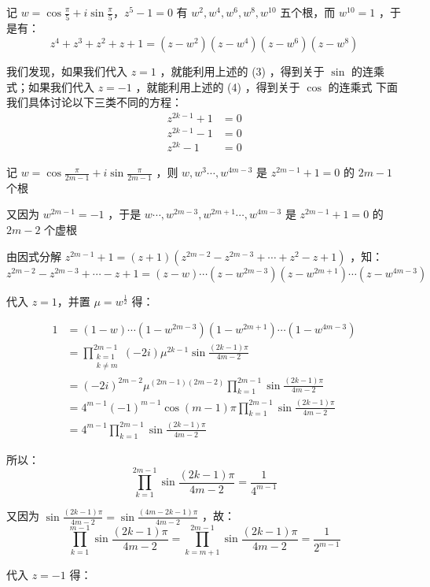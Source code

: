 记 $\displaystyle{w=\cos\frac{\pi}5+i\sin\frac{\pi}5}$，$z^5-1=0$ 有 $w^2,w^4,w^6,w^8,w^{10}$ 五个根，而 $w^{10}=1$ ，于是有：
$$z^4+z^3+z^2+z+1=(z-w^2)(z-w^4)(z-w^6)(z-w^8)$$

我们发现，如果我们代入 $z=1$ ，就能利用上述的 (3) ，得到关于 $\sin$ 的连乘式；如果我们代入 $z=-1$ ，就能利用上述的 (4) ，得到关于 $\cos$ 的连乘式
下面我们具体讨论以下三类不同的方程：
$$\begin{aligned}
z^{2k-1}+1&=0\\z^{2k-1}-1&=0 \\z^{2k}-1&=0
\end{aligned}$$

记 $\displaystyle{w=\cos\frac{\pi}{2m-1}+i\sin\frac{\pi}{2m-1}}$ ，则 $w,w^3\cdots,w^{4m-3}$ 是 $z^{2m-1}+1=0$ 的 $2m-1$ 个根

又因为 $w^{2m-1}=-1$ ，于是 $w\cdots ,w^{2m-3},w^{2m+1}\cdots ,w^{4m-3}$ 是 $z^{2m-1}+1=0$ 的 $2m-2$ 个虚根

由因式分解 $z^{2m-1}+1=(z+1)(z^{2m-2}-z^{2m-3}+\cdots+z^{2}-z+1)$ ，知：
$$z^{2m-2}-z^{2m-3}+\cdots-z+1=(z-w)\cdots(z-w^{2m-3})(z-w^{2m+1})\cdots(z-w^{4m-3})$$

代入 $z=1$，并置 $\mu=w^{\frac12}$ 得：

$$\begin{aligned}
1&=(1-w)\cdots(1-w^{2m-3})(1-w^{2m+1})\cdots(1-w^{4m-3})\\&=\prod_{\substack{k=1\\k\neq m}}^{2m-1}(-2i)\mu^{2k-1}\sin\frac{(2k-1)\pi}{4m-2}\\&=(-2i)^{2m-2}{\mu}^{(2m-1)(2m-2)}\prod_{k=1}^{2m-1}\sin{\frac{(2k-1)\pi}{4m-2}}\\ &=4^{m-1}(-1)^{m-1}\cos(m-1)\pi\prod_{k=1}^{2m-1}\sin{\frac{(2k-1)\pi}{4m-2}}\\ &=4^{m-1}\prod_{k=1}^{2m-1}\sin{\frac{(2k-1)\pi}{4m-2}}  
\end{aligned}$$

所以： 
\begin{equation}%
\prod_{k=1}^{2m-1}\sin{\frac{(2k-1)\pi}{4m-2}}=\frac{1}{4^{m-1}}
\end{equation}

又因为 $\displaystyle{\sin\frac{(2k-1)\pi}{4m-2}=\sin\frac{(4m-2k-1)\pi}{4m-2}}$ ，故：
\begin{equation}%
\prod_{k=1}^{m-1}\sin{\frac{(2k-1)\pi}{4m-2}}=\prod_{k=m+1}^{2m-1}\sin{\frac{(2k-1)\pi}{4m-2}}=\frac{1}{2^{m-1}}
\end{equation}

代入 $z=-1$ 得：

